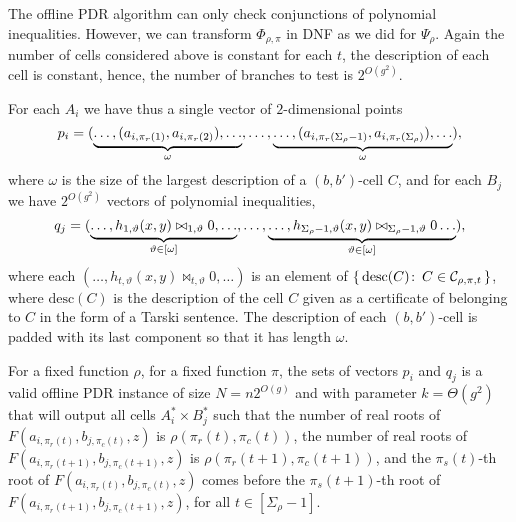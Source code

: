 The offline PDR algorithm can only check conjunctions of polynomial inequalities.
However, we can transform $\Phi_{\rho,\pi}$ in DNF as we did for $\Psi_{\rho}$.
Again the number of cells considered above is constant for each $t$, the
description of each cell is constant, hence, the number of branches to test is
$2^{O(g^2)}$.

For each $A_i$ we have thus a single vector of $2$-dimensional points
\begin{displaymath}
	p_i = (
		\underbrace{%
			\ldots,
			(a_{i,\pi_r(1)},a_{i,\pi_r(2)}),
			\ldots%
		}_{\omega},
		\ldots,
		\underbrace{%
			\ldots,
			(a_{i,\pi_r(\Sigma_\rho-1)},a_{i,\pi_r(\Sigma_\rho)}),
			\ldots%
		}_{\omega}
	),
\end{displaymath}
where $\omega$ is the size of the largest description of a $(b,b')$-cell $C$,
and for each $B_j$ we have $2^{O(g^2)}$ vectors of polynomial inequalities,
\begin{displaymath}
	q_j = (
		\underbrace{%
		\ldots,
		h_{1,\vartheta}(x,y) \bowtie_{1,\vartheta} 0,
		\ldots%
	}_{\vartheta \in [\omega]}
		,\ldots,
		\underbrace{%
		\ldots,
		h_{\Sigma_\rho-1,\vartheta}(x,y) \bowtie_{\Sigma_\rho-1,\vartheta} 0
		\ldots%
	}_{\vartheta \in [\omega]}
	),
\end{displaymath}
where each $(\ldots, h_{t,\vartheta}(x,y) \bowtie_{t,\vartheta} 0, \ldots)$
is an element of
$\{\, \text{desc}(C) \colon\, C \in \mathcal{C}_{\rho,\pi,t}\,\}$,
where $\text{desc}(C)$ is the description of the cell $C$ given as a
certificate of belonging to $C$ in the form of a Tarski sentence.
The description of each $(b,b')$-cell is padded with
its last component so that it has length $\omega$.

For a fixed function $\rho$,
for a fixed function $\pi$,
the sets of vectors $p_i$ and $q_j$ is a valid offline PDR instance
of size $N = n 2^{O(g)}$ and with parameter $k = \Theta(g^2)$
that will
output all cells $A^*_i \times B^*_j$ such that
the number of real roots of $F(a_{i,\pi_r(t)},b_{j,\pi_c(t)},z)$
is $\rho(\pi_r(t),\pi_c(t))$,
the number of real roots of $F(a_{i,\pi_r(t+1)},b_{j,\pi_c(t+1)},z)$
is $\rho(\pi_r(t+1),\pi_c(t+1))$,
and the $\pi_s(t)$-th root of $F(a_{i,\pi_r(t)},b_{j,\pi_c(t)},z)$
comes before the $\pi_s(t+1)$-th root of
$F(a_{i,\pi_r(t+1)},b_{j,\pi_c(t+1)},z)$,
for all $t \in [\Sigma_\rho-1]$.

